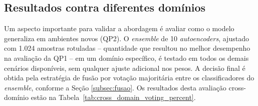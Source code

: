 \documentclass{article}
\begin{document}
\subsection{Resultados contra diferentes domínios}

Um aspecto importante para validar a abordagem é avaliar como o modelo generaliza em ambientes novos (QP2). O \textit{ensemble} de 10 \textit{autoencoders}, ajustado com 1.024 amostras rotuladas -- quantidade que resultou no melhor desempenho na avaliação da QP1 -- em um domínio específico, é testado em todos os demais cenários disponíveis, sem qualquer ajuste adicional nos pesos. A decisão final é obtida pela estratégia de fusão por votação majoritária entre os classificadores do \textit{ensemble}, conforme a Seção \ref{subsec:fusao}. Os resultados desta avaliação cross-domínio estão na Tabela~\ref{tab:cross_domain_voting_percent}.
\end{document}
